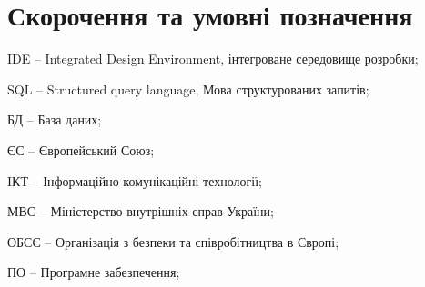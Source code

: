 \chapter*{Скорочення та умовні позначення}

IDE – Integrated Design Environment, інтегроване середовище розробки;

SQL – Structured query language, Мова структурованих запитів;

БД – База даних;

ЄС – Європейський Союз;

IКТ – Інформаційно-комунікаційні технології;

МВС – Міністерство внутрішніх справ України;

ОБСЄ – Організація з безпеки та співробітництва в Європі;

ПО – Програмне забезпечення;
